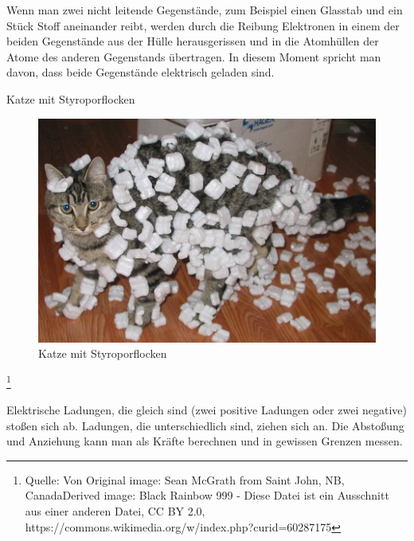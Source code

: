 \documentclass[aspectratio=169, ignorenonframetext]{beamer}
\begin{document}
Wenn man zwei nicht leitende Gegenstände, zum Beispiel einen Glasstab und ein Stück Stoff aneinander reibt, werden durch die Reibung Elektronen in einem der beiden Gegenstände aus der Hülle herausgerissen und in die Atomhüllen der Atome des anderen Gegenstands übertragen. In diesem Moment spricht man davon, dass beide Gegenstände elektrisch geladen sind.
\begin{frame}{Katze mit Styroporflocken}
  \begin{figure}[htb]
    \includegraphics{Cat_demonstrating_static_cling_with_styrofoam_peanuts.jpeg}
    \caption{Katze mit Styroporflocken}
    \label{abb:CatWidthStyropor}
    \end{figure}
  \footnote{Quelle: Von Original image: Sean McGrath from Saint John, NB, CanadaDerived image: Black Rainbow 999 - Diese Datei ist ein Ausschnitt aus einer anderen Datei, CC BY 2.0, https://commons.wikimedia.org/w/index.php?curid=60287175}
\end{frame}


Elektrische Ladungen, die gleich sind (zwei positive Ladungen oder zwei negative) stoßen sich ab. Ladungen, die unterschiedlich sind, ziehen sich an. Die Abstoßung und Anziehung kann man als Kräfte berechnen und in gewissen Grenzen messen.
\end{document}
